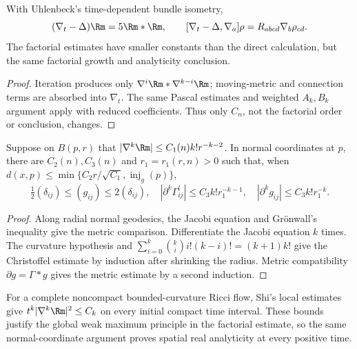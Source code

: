 \begin{example}
\label{ex:chow-ii-uhlenbeck-curvature-commutators}
With Uhlenbeck's time-dependent bundle isometry,
\[
 (\nabla_t-\Delta)\Rm=5\Rm*\Rm,
 \qquad [\nabla_t-\Delta,\nabla_a]\rho
 =R_{abcd}\nabla_b\rho_{cd}.
\]
The factorial estimates have smaller constants than the direct calculation,
but the same factorial growth and analyticity conclusion.
\end{example}
\begin{proof}
\sketch
{}
Iteration produces only \(\nabla^i\Rm*\nabla^{k-i}\Rm\); moving-metric and
connection terms are absorbed into \(\nabla_t\).  The same Pascal estimates
and weighted \(A_k,B_k\) argument apply with reduced coefficients.  Thus only
\(C_n\), not the factorial order or conclusion, changes.
\end{proof}

\begin{lemma}
\label{lem:chow-ii-normal-coordinate-metric-derivatives}
Suppose on \(B(p,r)\) that
\(|\nabla^k\Rm|\leq C_1(n)k!r^{-k-2}\).  In normal coordinates at \(p\),
there are \(C_2(n),C_3(n)\) and \(r_1=r_1(r,n)>0\) such that, when
\(d(x,p)\leq\min\{C_2r/\sqrt{C_1},\operatorname{inj}_g(p)\}\),
\[
 \tfrac12(\delta_{ij})\leq(g_{ij})\leq2(\delta_{ij}),\quad
 |\partial^k\Gamma^l_{ij}|\leq C_3k!r_1^{-k-1},\quad
 |\partial^kg_{ij}|\leq C_3k!r_1^{-k}.
\]
\end{lemma}
\begin{proof}
\sketch
Along radial normal geodesics, the Jacobi equation and Grönwall's inequality
give the metric comparison.  Differentiate the Jacobi equation \(k\) times.
The curvature hypothesis and
\(\sum_{i=0}^k\binom{k}{i}i!(k-i)!=(k+1)k!\) give the Christoffel estimate by
induction after shrinking the radius.  Metric compatibility
\(\partial g=\Gamma*g\) gives the metric estimate by a second induction.
\end{proof}

\begin{remark}
\label{rem:chow-ii-noncompact-analyticity}
For a complete noncompact bounded-curvature Ricci flow, Shi's local estimates
give \(t^k|\nabla^k\Rm|^2\leq C_k\) on every initial compact time interval.
These bounds justify the global weak maximum principle in the factorial
estimate, so the same normal-coordinate argument proves spatial real
analyticity at every positive time.
\end{remark}
